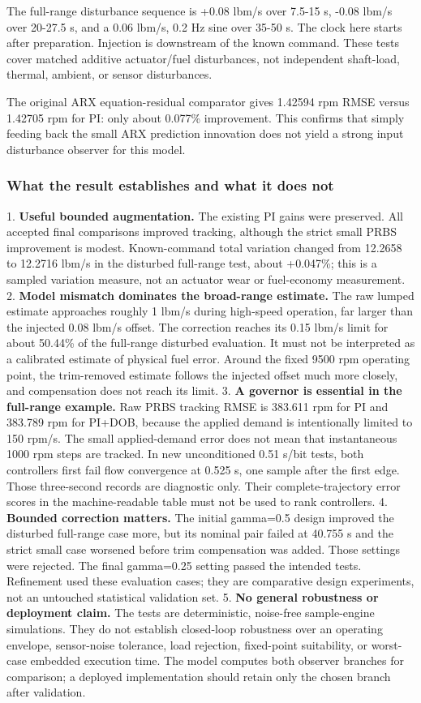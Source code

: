 The full-range disturbance sequence is +0.08 lbm/s over 7.5-15 s, -0.08 lbm/s
over 20-27.5 s, and a 0.06 lbm/s, 0.2 Hz sine over 35-50 s. The clock here
starts after preparation. Injection is downstream of the known command.
These tests cover matched additive actuator/fuel disturbances, not independent
shaft-load, thermal, ambient, or sensor disturbances.

The original ARX equation-residual comparator gives 1.42594 rpm RMSE versus
1.42705 rpm for PI: only about 0.077\% improvement. This confirms that simply
feeding back the small ARX prediction innovation does not yield a strong input
disturbance observer for this model.

\subsubsection{What the result establishes and what it does not}

1. \textbf{Useful bounded augmentation.} The existing PI gains were preserved. All
accepted final comparisons improved tracking, although the strict small PRBS
improvement is modest. Known-command total variation changed from 12.2658
to 12.2716 lbm/s in the disturbed full-range test, about +0.047\%; this is a
sampled variation measure, not an actuator wear or fuel-economy measurement.
2. \textbf{Model mismatch dominates the broad-range estimate.} The raw lumped estimate
approaches roughly 1 lbm/s during high-speed operation, far larger than the
injected 0.08 lbm/s offset. The correction reaches its 0.15 lbm/s limit for
about 50.44\% of the full-range disturbed evaluation. It must not be interpreted
as a calibrated estimate of physical fuel error. Around the fixed 9500 rpm
operating point, the trim-removed estimate follows the injected offset much
more closely, and compensation does not reach its limit.
3. \textbf{A governor is essential in the full-range example.} Raw PRBS tracking RMSE
is 383.611 rpm for PI and 383.789 rpm for PI+DOB, because the applied demand
is intentionally limited to 150 rpm/s. The small applied-demand error does
not mean that instantaneous 1000 rpm steps are tracked. In new unconditioned
0.51 s/bit tests, both controllers first fail flow convergence at 0.525 s,
one sample after the first edge. Those three-second records are diagnostic
only. Their complete-trajectory error scores in the machine-readable table
must not be used to rank controllers.
4. \textbf{Bounded correction matters.} The initial gamma=0.5 design improved the
disturbed full-range case more, but its nominal pair failed at 40.755 s and
the strict small case worsened before trim compensation was added. Those
settings were rejected. The final gamma=0.25 setting passed the intended
tests. Refinement used these evaluation cases; they are comparative design
experiments, not an untouched statistical validation set.
5. \textbf{No general robustness or deployment claim.} The tests are deterministic,
noise-free sample-engine simulations. They do not establish closed-loop
robustness over an operating envelope, sensor-noise tolerance, load rejection,
fixed-point suitability, or worst-case embedded execution time. The model
computes both observer branches for comparison; a deployed implementation
should retain only the chosen branch after validation.

